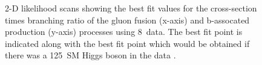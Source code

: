 \begin{figure}[tbh]

\caption{2-D likelihood scans showing the best fit values for the cross-section
times branching ratio of the gluon fusion (x-axis) and b-assocated production
(y-axis) processes using 8~\TeV data. The best fit point is indicated along with the best fit
point which would be obtained if there was a 125~\GeV \ac{SM} Higgs boson in the data \cite{HIG-13-021}.}
\label{fig:2Dlikelihood}
\end{figure}


